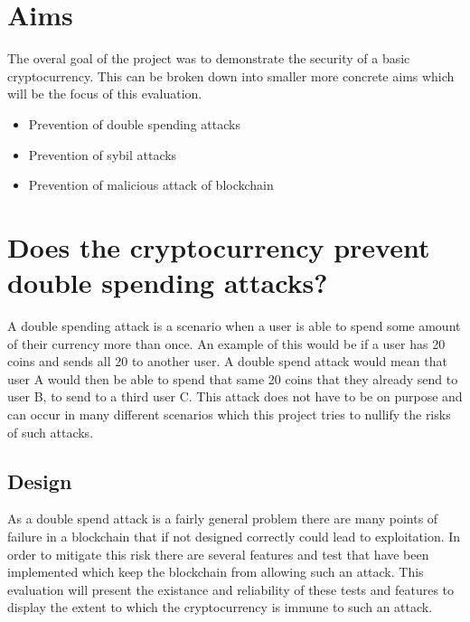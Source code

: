\documentclass{l4proj}
\begin{document}


\section{Aims}
The overal goal of the project was to demonstrate the security of a basic cryptocurrency. This can be broken down into
smaller more concrete aims which will be the focus of this evaluation.
\begin{itemize}
    \item Prevention of double spending attacks
    \item Prevention of sybil attacks
    \item Prevention of malicious attack of blockchain
\end{itemize}

\section{Does the cryptocurrency prevent double spending attacks?}
A double spending attack is a scenario when a user is able to spend some amount of their currency more than once. An example
of this would be if a user has 20 coins and sends all 20 to another user. A double spend attack would mean that user A would
then be able to spend that same 20 coins that they already send to user B, to send to a third user C. This attack does not have
to be on purpose and can occur in many different scenarios which this project tries to nullify the risks of such attacks.

\subsection{Design}
As a double spend attack is a fairly general problem there are many points of failure in a blockchain that if not designed
correctly could lead to exploitation. In order to mitigate this risk there are several features and test that have been
implemented which keep the blockchain from allowing such an attack. This evaluation will present the existance and 
reliability of these tests and features to display the extent to which the cryptocurrency is immune to such an attack.
\end{document}
